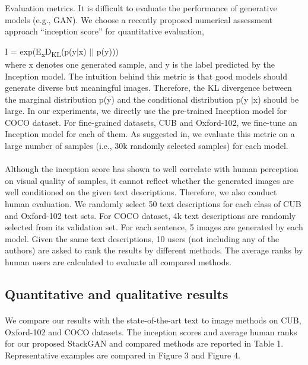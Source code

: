 \documentclass[a4paper,12pt,oneside]{article}
\begin{document}
Evaluation metrics. It is difficult to evaluate the performance of generative models (e.g., GAN). We choose a recently proposed numerical assessment approach “inception score” for quantitative evaluation, 

I = exp(E\textsubscript{x}D\textsubscript{KL}(p(y$\mid$x) $\mid$$\mid$ p(y)))
\\
where x denotes one generated sample, and y is the label predicted by the Inception model. The intuition behind this metric is that good models should generate diverse but meaningful images. Therefore, the KL divergence between the marginal distribution p(y) and the conditional distribution p(y $\mid$x) should be large. In our experiments, we directly use the pre-trained Inception model for COCO dataset. For fine-grained datasets, CUB and Oxford-102, we fine-tune an Inception model for each of them. As suggested in, we evaluate this metric on a large number of samples (i.e., 30k randomly selected samples) for each model. 

\paragraph{}
Although the inception score has shown to well correlate with human perception on visual quality of samples, it cannot reflect whether the generated images are well conditioned on the given text descriptions. Therefore, we also conduct human evaluation. We randomly select 50 text descriptions for each class of CUB and Oxford-102 test sets. For COCO dataset, 4k text descriptions are randomly selected from its validation set. For each sentence, 5 images are generated by each model. Given the same text descriptions, 10 users (not including any of the authors) are asked to rank the results by different methods. The average ranks by human users are calculated to evaluate all compared methods. 

\subsection{Quantitative and qualitative results}
\paragraph{}
We compare our results with the state-of-the-art text to image methods on CUB, Oxford-102 and COCO datasets. The inception scores and average human ranks for our proposed StackGAN and compared methods are reported in Table 1. Representative examples are compared in Figure 3 and Figure 4. 
\end{document}
